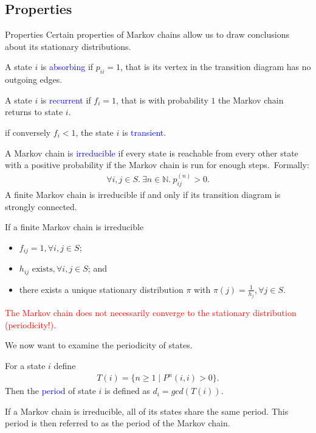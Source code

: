 \documentclass{beamer}
\def\padding{\vspace{0.5cm}}
\def\spadding{\vspace{0.25cm}}
\def\b{\textcolor{blue}}
\def\r{\textcolor{red}}
\begin{document}
\subsection{Properties}
\begin{frame}{Properties}
    Certain properties of Markov chains allow us to draw conclusions about its stationary distributions.\pause\par\padding
    \begin{definition}
        A state $i$ is \b{absorbing} if $p_{ii} = 1$, that is its vertex in the transition diagram has no outgoing edges.\pause\par\spadding
        A state $i$ is \b{recurrent} if $f_{i} = 1$, that is with probability $1$ the Markov chain returns to state $i$.\pause\par
        if conversely $f_{i} < 1$, the state $i$ is \b{transient}.
    \end{definition}
\end{frame}

\begin{frame}
    \begin{definition}
        A Markov chain is \b{irreducible} if every state is reachable from every other state with a positive probability if the Markov chain is run for enough steps.\pause\ Formally:
        \begin{align*}
            \forall i, j \in S.\ \exists n \in \mathbb{N}.\ p_{ij}^{(n)} > 0.
        \end{align*}\pause
        A finite Markov chain is irreducible if and only if its transition diagram is strongly connected.\pause\par\spadding
        If a finite Markov chain is irreducible\pause
        \begin{itemize}
            \item $f_{ij} = 1, \forall i, j \in S$\pause;
            \item $h_{ij} \text{ exists}, \forall i, j \in S$\pause; and
            \item there exists a unique stationary distribution $\pi$ with $\pi(j) = \frac{1}{h_{j}}, \forall j \in S$.
        \end{itemize}\pause
        \r{The Markov chain does not necessarily converge to the stationary distribution (periodicity!).}
    \end{definition}
\end{frame}

\begin{frame}
    We now want to examine the periodicity of states.\pause
    \begin{definition}
        For a state $i$ define
        \begin{align*}
            T(i) = \{n \geq 1 \mid P^n(i,i) > 0\}.
        \end{align*}\pause
        Then the \b{period} of state $i$ is defined as $d_i = gcd(T(i))$.\pause\par\padding
        If a Markov chain is irreducible, all of its states share the same period. This period is then referred to as the period of the Markov chain.
    \end{definition}
\end{frame}
\end{document}
